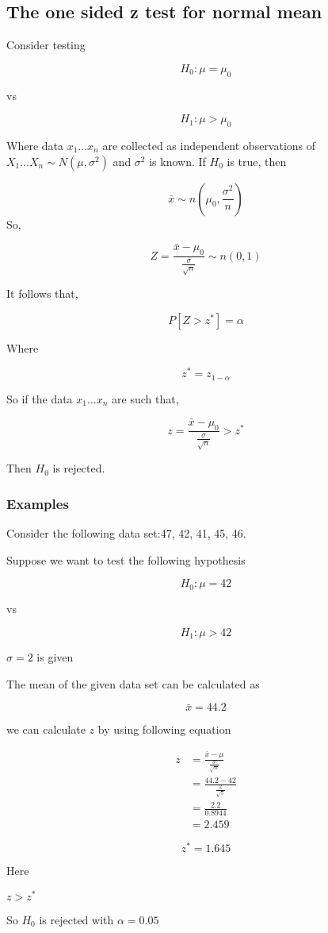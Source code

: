 \documentclass[12pt,a4paper]{article}
\theoremstyle{regla}
\theoremstyle{remark}
\theoremstyle{definition}
\theoremstyle{nonumberbreak}
\begin{document}
\subsection{The one sided z test for normal mean}
\begin{fbox}
\begin{minipage}{0.97\textwidth}
Consider testing

$$ H_0: \mu = \mu_0$$

vs

$$ H_1: \mu > \mu_0$$

 

Where data $x_1 \ldots x_n$ are collected as independent observations of $X_1 \ldots X_n \sim N(\mu, \sigma^2)$ and $\sigma^2$ is known. If $H_0$ is true, then

$$ \bar {x} \sim n (\mu_0, \frac{\sigma^2}{n})$$
So, 

$$Z = \frac{\bar {x} - \mu_0}{\frac{\sigma} {\sqrt{n}}} \sim n (0,1)$$

It follows that,

$$P[Z>z^\ast] = \alpha$$

Where 

$$z^\ast = z_{1-\alpha}$$

So if the data $x_1 \ldots x_n$ are such that,


$$z = \frac{\bar {x} - \mu_0}{\frac{\sigma} {\sqrt{n}}}  > z^\ast$$

Then $H_0 $ is rejected.


\end{minipage}
\end{fbox}
\subsubsection{Examples}
\begin{xmpl}

Consider the following data set:47, 42, 41, 45, 46.

Suppose we want to test the following hypothesis

$$H_0 : \mu = 42 $$

vs

$$H_1 : \mu > 42 $$

 $\sigma = 2$ is given

The mean of the given data set can be calculated as

$$\bar {x} = 44.2$$

we can calculate $z$ by using following equation

\begin{align*}
  z&= \frac{\bar {x} - \mu}{\frac{\sigma} {\sqrt{n}}}\\
  &= \frac{44.2 - 42}{\frac{2} {\sqrt{5}}}\\
  &= \frac{2.2}{0.8944}\\
  &= 2.459
\end{align*}


$$z^\ast = 1.645$$

Here

 $z> z^\ast$ 

So $ H_0$ is rejected with $\alpha = 0.05$
\end{xmpl}
\end{document}
